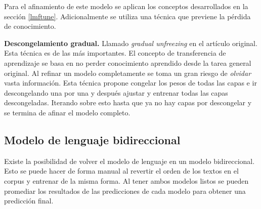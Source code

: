 Para el afinamiento de este modelo se aplican los conceptos desarrollados en la sección \ref{lmftune}. Adicionalmente se utiliza una técnica que previene la pérdida de conocimiento.

\textbf{Descongelamiento gradual.} Llamado \emph{gradual unfreezing} en el artículo original. Esta técnica es de las más importantes. El concepto de transferencia de aprendizaje se basa en no perder conocimiento aprendido desde la tarea general original. Al refinar un modelo completamente se toma un gran riesgo de \emph{olvidar} vasta información. Esta técnica propone congelar los pesos de todas las capas e ir descongelando una por una y después ajustar y entrenar todas las capas descongeladas. Iterando sobre esto hasta que ya no hay capas por descongelar y se termina de afinar el modelo completo.

\subsection{Modelo de lenguaje bidireccional}

Existe la posibilidad de volver el modelo de lenguaje en un modelo bidireccional. Esto se puede hacer de forma manual al revertir el orden de los textos en el corpus y entrenar de la misma forma. Al tener ambos modelos listos se pueden promediar los resultados de las predicciones de cada modelo para obtener una predicción final.


